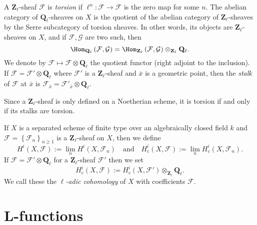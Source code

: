 \begin{definition}
\label{definition-torsion-l-adic-sheaf}
A $\mathbf{Z}_\ell$-sheaf $\mathcal{F}$ is {\it torsion} if
$\ell^n : \mathcal{F} \to \mathcal{F}$ is the zero map for some $n$.
The abelian category
of $\mathbf{Q}_\ell$-sheaves on $X$ is the quotient of the abelian category of
$\mathbf{Z}_\ell$-sheaves by the Serre subcategory of torsion sheaves. In
other words, its objects are $\mathbf{Z}_\ell$-sheaves on $X$, and if
$\mathcal{F}, \mathcal{G}$ are two such, then
$$
\Hom_{\mathbf{Q}_\ell} \left(\mathcal{F}, \mathcal{G} \right) =
\Hom_{\mathbf{Z}_\ell} \left(\mathcal{F}, \mathcal{G}\right)
\otimes_{\mathbf{Z}_\ell} \mathbf{Q}_\ell.
$$
We denote by $\mathcal{F} \mapsto \mathcal{F} \otimes \mathbf{Q}_\ell$ the
quotient functor (right adjoint to the inclusion). If $\mathcal{F} =
\mathcal{F}' \otimes \mathbf{Q}_\ell$ where $\mathcal{F}'$ is a
$\mathbf{Z}_\ell$-sheaf and $\bar x$ is a geometric point, then the
{\it stalk} of $\mathcal{F}$ at $\bar x$ is $\mathcal{F}_{\bar x} =
\mathcal{F}'_{\bar x} \otimes \mathbf{Q}_\ell$.
\end{definition}

\begin{remark}
\label{remark-torsion-stalks}
Since a $\mathbf{Z}_\ell$-sheaf is only defined on a Noetherian scheme, it is
torsion if and only if its stalks are torsion.
\end{remark}

\begin{definition}
\label{definition-cohomology-l-adic}
If $X$ is a separated scheme of finite type over an algebraically closed field
$k$ and $\mathcal{F} = \left\{\mathcal{F}_n\right\}_{n\geq 1}$ is a
$\mathbf{Z}_\ell$-sheaf on $X$, then we define
$$
H^i(X, \mathcal{F}) := \lim_n H^i(X, \mathcal{F}_n)
\quad\text{and}\quad
H_c^i(X, \mathcal{F}) := \lim_n H_c^i(X, \mathcal{F}_n).
$$
If $\mathcal{F} = \mathcal{F}'\otimes \mathbf{Q}_\ell$ for a
$\mathbf{Z}_\ell$-sheaf $\mathcal{F}'$ then we set
$$
H_c^i(X , \mathcal{F}) := H_c^i(X,
\mathcal{F}')\otimes_{\mathbf{Z}_\ell}\mathbf{Q}_\ell.
$$
We call these the {\it $\ell$-adic cohomology} of $X$ with coefficients
$\mathcal{F}$.
\end{definition}





\section{L-functions}
\label{section-L-function}

